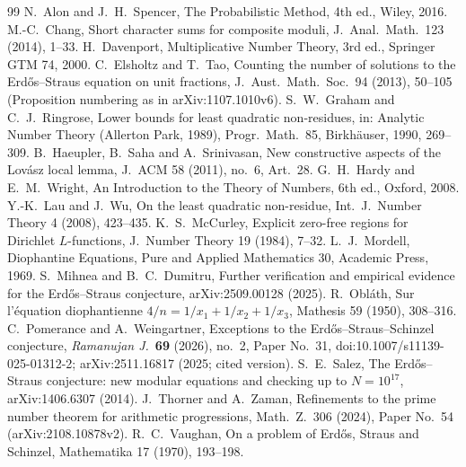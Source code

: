 \documentclass[11pt,reqno]{amsart}
\theoremstyle{definition}
\begin{document}
\begin{thebibliography}{99}
 N.~Alon and J.~H.~Spencer, The Probabilistic Method, 4th ed.,
Wiley, 2016.
 M.-C.~Chang, Short character sums for composite moduli,
J.\ Anal.\ Math.\ 123 (2014), 1--33.
 H.~Davenport, Multiplicative Number Theory, 3rd ed., Springer GTM 74, 2000.
 C.~Elsholtz and T.~Tao, Counting the number of solutions to the
Erd\H{o}s--Straus equation on unit fractions, J.\ Aust.\ Math.\ Soc.\ 94 (2013),
50--105 (Proposition numbering as in arXiv:1107.1010v6).
 S.~W.~Graham and C.~J.~Ringrose, Lower bounds for least quadratic
non-residues, in: Analytic Number Theory (Allerton Park, 1989), Progr.\ Math.\ 85,
Birkh\"auser, 1990, 269--309.
 B.~Haeupler, B.~Saha and A.~Srinivasan, New constructive aspects of
the Lov\'asz local lemma, J.\ ACM 58 (2011), no.~6, Art.~28.
 G.~H.~Hardy and E.~M.~Wright, An Introduction to the Theory of
Numbers, 6th ed., Oxford, 2008.
 Y.-K.~Lau and J.~Wu, On the least quadratic non-residue,
Int.\ J.\ Number Theory 4 (2008), 423--435.
 K.~S.~McCurley, Explicit zero-free regions for Dirichlet
$L$-functions, J.\ Number Theory 19 (1984), 7--32.
 L.~J.~Mordell, Diophantine Equations, Pure and Applied
Mathematics 30, Academic Press, 1969.
 S.~Mihnea and B.~C.~Dumitru, Further verification and empirical
evidence for the Erd\H{o}s--Straus conjecture, arXiv:2509.00128 (2025).
 R.~Obl\'ath, Sur l'\'equation diophantienne
$4/n=1/x_1+1/x_2+1/x_3$, Mathesis 59 (1950), 308--316.
 C.~Pomerance and A.~Weingartner, Exceptions to the
Erd\H{o}s--Straus--Schinzel conjecture, \emph{Ramanujan J.}\ \textbf{69} (2026), no.~2, Paper No.~31,
doi:10.1007/s11139-025-01312-2; arXiv:2511.16817 (2025;
cited version).
 S.~E.~Salez, The Erd\H{o}s--Straus conjecture: new modular
equations and checking up to $N=10^{17}$, arXiv:1406.6307 (2014).
 J.~Thorner and A.~Zaman, Refinements to the prime number theorem
for arithmetic progressions, Math.\ Z.\ 306 (2024), Paper No.~54
(arXiv:2108.10878v2).
 R.~C.~Vaughan, On a problem of Erd\H{o}s, Straus and
Schinzel, Mathematika 17 (1970), 193--198.
\end{thebibliography}
\end{document}
